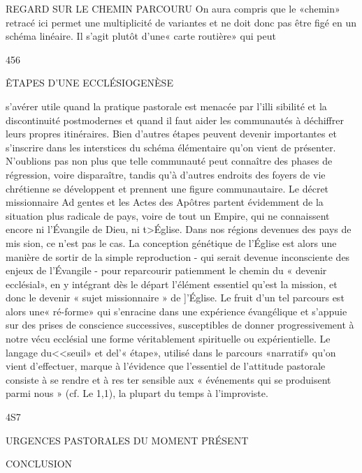{REGARD SUR LE CHEMIN PARCOURU
On aura compris que le «chemin» retracé ici permet une multiplicité de variantes et ne doit donc pas être figé en un schéma linéaire. Il s'agit plutôt d'une« carte routière» qui peut

456
 
ÊTAPES D'UNE ECCLÉSIOGENÈSE

s'avérer utile quand la pratique pastorale est menacée par l'illi­ sibilité et la discontinuité postmodernes et quand il faut aider les communautés à déchiffrer leurs propres itinéraires. Bien d'autres étapes peuvent devenir importantes et s'inscrire dans les interstices du schéma élémentaire qu'on vient de présenter. N'oublions pas non plus que telle communauté peut connaître des phases de régression, voire disparaître, tandis qu'à d'autres endroits des foyers de vie chrétienne se développent et prennent une figure communautaire.
Le décret missionnaire Ad gentes et les Actes des Apôtres partent évidemment de la situation plus radicale de pays, voire de tout un Empire, qui ne connaissent encore ni l'Évangile de Dieu, ni t>Église. Dans nos régions devenues des pays de mis­ sion, ce n'est pas le cas. La conception génétique de l'Église est alors une manière de sortir de la simple reproduction - qui serait devenue inconsciente des enjeux de l'Évangile - pour reparcourir patiemment le chemin du « devenir ecclésial», en y intégrant dès le départ l'élément essentiel qu'est la mission, et donc le devenir « sujet missionnaire » de ]'Église. Le fruit d'un tel parcours est alors une« ré-forme» qui s'enracine dans une expérience évangélique et s'appuie sur des prises de conscience successives, susceptibles de donner progressivement à notre vécu ecclésial une forme véritablement spirituelle ou expérientielle. Le langage du<<seuil» et del'« étape», utilisé dans le parcours
«narratif» qu'on vient d'effectuer, marque à l'évidence que
l'essentiel de l'attitude pastorale consiste à se rendre et à res­ ter sensible aux « événements qui se produisent parmi nous » (cf. Le 1,1), la plupart du temps à l'improviste.

4S7
 
URGENCES PASTORALES DU MOMENT PRÉSENT



CONCLUSION

}
